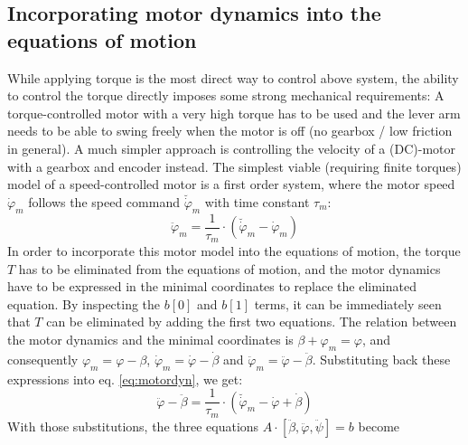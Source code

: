 \documentclass{article}
\begin{document}
\subsection{Incorporating motor dynamics into the equations of motion}
\label{ss:EoM}
While applying torque is the most direct way to control above system, the ability to control the torque directly imposes some strong mechanical requirements: 
A torque-controlled motor with a very high torque has to be used and the lever arm needs to be able to swing freely when the motor is off (no gearbox / low friction in general).
A much simpler approach is controlling the velocity of a (DC)-motor with a gearbox and encoder instead. The simplest viable (requiring finite torques) model of a speed-controlled motor is a first order system, where the motor speed $\dot{\varphi}_m$ follows the speed command $\breve{\dot{\varphi}}_m$ with time constant $\tau_m$:
\begin{equation}
\ddot{\varphi}_m = \frac{1}{\tau_m} \cdot \left(\breve{\dot{\varphi}}_m - \dot{\varphi}_m \right)
\label{eq:motordyn}
\end{equation} 
In order to incorporate this motor model into the equations of motion, the torque $T$ has to be eliminated from the equations of motion, and the motor dynamics have to be expressed in the minimal coordinates to replace the eliminated equation.
By inspecting the $b[0]$ and $b[1]$ terms, it can be immediately seen that $T$ can be eliminated by adding the first two equations. 
The relation between the motor dynamics and the minimal coordinates is $\beta + \varphi_m = \varphi$, and consequently $\varphi_m = \varphi - \beta$, $\dot{\varphi}_m = \dot{\varphi} - \dot{\beta}$ and $\ddot{\varphi}_m = \ddot{\varphi} - \ddot{\beta}$.
Substituting back these expressions into eq. \ref{eq:motordyn}, we get:
\begin{equation}
\ddot{\varphi} - \ddot{\beta} = \frac{1}{\tau_m} \cdot \left(\breve{\dot{\varphi}}_m - \dot{\varphi} + \dot{\beta} \right)
\end{equation}
With those substitutions, the three equations $A \cdot [\ddot{\beta}, \ddot{\varphi}, \ddot{\psi}] = b$ become
\end{document}
